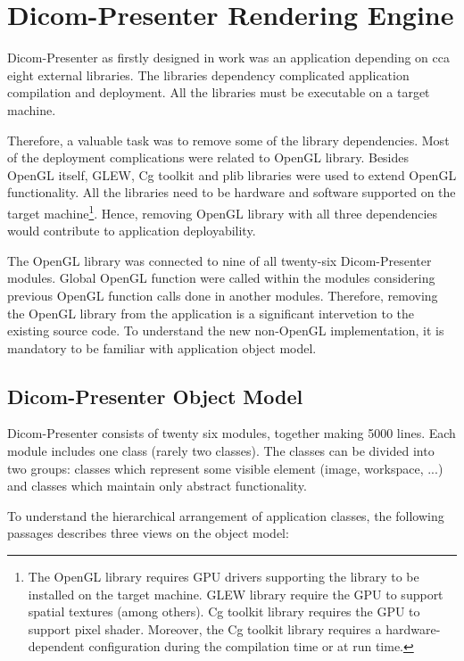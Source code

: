 \chapter{Dicom-Presenter Rendering Engine}
\vspace{-10mm}
Dicom-Presenter as firstly designed in work \cite{neskudla} was an application depending on cca eight external libraries. The libraries dependency complicated application compilation and deployment. All the libraries must be executable on a target machine.

Therefore, a valuable task was to remove some of the library dependencies. Most of the deployment complications were related to OpenGL library. Besides OpenGL itself, GLEW, Cg toolkit and plib libraries were used to extend OpenGL functionality. All the libraries need to be hardware and software supported on the target machine\footnote{The OpenGL library requires GPU drivers supporting the library to be installed on the target machine. GLEW library require the GPU to support spatial textures (among others). Cg toolkit library requires the GPU to support pixel shader. Moreover, the Cg toolkit library requires a hardware-dependent configuration during the compilation time or at run time.}. Hence, removing OpenGL library with all three dependencies would contribute to application deployability.

The OpenGL library was connected to nine of all twenty-six Dicom-Presenter modules. Global OpenGL function were called within the modules considering previous OpenGL function calls done in another modules. Therefore, removing the OpenGL library from the application is a significant intervetion to the existing source code. To understand the new non-OpenGL implementation, it is mandatory to be familiar with application object model.

\section{Dicom-Presenter Object Model}

Dicom-Presenter consists of twenty six modules, together making 5000 lines. Each module includes one class (rarely two classes). The classes can be divided into two groups: classes which represent some visible element (image, workspace, ...) and classes which maintain only abstract functionality.

To understand the hierarchical arrangement of application classes, the following passages describes three views on the object model:

